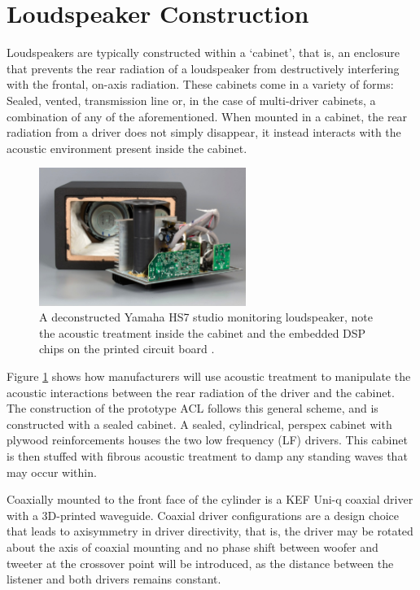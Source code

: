 \documentclass{report}
\begin{document}
    \section{Loudspeaker Construction}
        Loudspeakers are typically constructed within a `cabinet', that is, an enclosure that prevents the rear radiation of a loudspeaker from destructively interfering with the frontal, on-axis radiation.
        These cabinets come in a variety of forms: Sealed, vented, transmission line or, in the case of multi-driver cabinets, a combination of any of the aforementioned.
        When mounted in a cabinet, the rear radiation from a driver does not simply disappear, it instead interacts with the acoustic environment present inside the cabinet.

        \begin{figure}[H]
            \centering
            \includegraphics[width = 0.6\textwidth]{figs/hs-7back.jpg}
            \caption{A deconstructed Yamaha HS7 studio monitoring loudspeaker, note the acoustic treatment inside the cabinet and the embedded DSP chips on the printed circuit board \cite{ASRcrosssection}.}
            \label{hs-7back}
        \end{figure}

        Figure \ref{hs-7back} shows how manufacturers will use acoustic treatment to manipulate the acoustic interactions between the rear radiation of the driver and the cabinet.
        The construction of the prototype ACL follows this general scheme, and is constructed with a sealed cabinet.
        A sealed, cylindrical, perspex cabinet with plywood reinforcements houses the two low frequency (LF) drivers.
        This cabinet is then stuffed with fibrous acoustic treatment to damp any standing waves that may occur within.

        Coaxially mounted to the front face of the cylinder is a KEF Uni-q coaxial driver with a 3D-printed waveguide.
        Coaxial driver configurations are a design choice that leads to axisymmetry in driver directivity, that is, the driver may be rotated about the axis of coaxial mounting and no phase shift between woofer and tweeter at the crossover point will be introduced, as the distance between the listener and both drivers remains constant.
\end{document}
